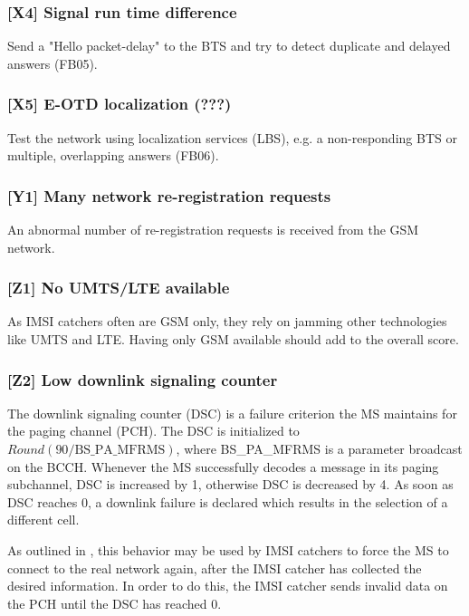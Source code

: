 \documentclass[a4paper,11pt,notitlepage,bigheadings,oneside]{scrartcl}
\begin{document}
\subsubsection{[X4] Signal run time difference}

Send a "Hello packet-delay" to the BTS and try to detect duplicate and delayed
answers (FB05).

\subsubsection{[X5] E-OTD localization (???)}

Test the network using localization services (LBS), e.g. a non-responding BTS
or multiple, overlapping answers (FB06).

\subsubsection{[Y1] Many network re-registration requests}

An abnormal number of re-registration requests is received from the GSM
network.

\subsubsection{[Z1] No UMTS/LTE available}

As IMSI catchers often are GSM only, they rely on jamming other technologies
like UMTS and LTE. Having only GSM available should add to the overall score.

\subsubsection{[Z2] Low downlink signaling counter}

The downlink signaling counter (DSC) is a failure criterion the MS maintains
for the paging channel (PCH). The DSC is initialized to
$Round(90/\text{BS\_PA\_MFRMS})$, where BS\_PA\_MFRMS is a parameter broadcast
on the BCCH. Whenever the MS successfully decodes a message in its paging
subchannel, DSC is increased by 1, otherwise DSC is decreased by 4. As soon as
DSC reaches 0, a downlink failure is declared which results in the selection of
a different cell.

As outlined in \cite{bott2000verfahren}, this behavior may be used by IMSI
catchers to force the MS to connect to the real network again, after the IMSI
catcher has collected the desired information. In order to do this, the IMSI
catcher sends invalid data on the PCH until the DSC has reached 0.
\end{document}

